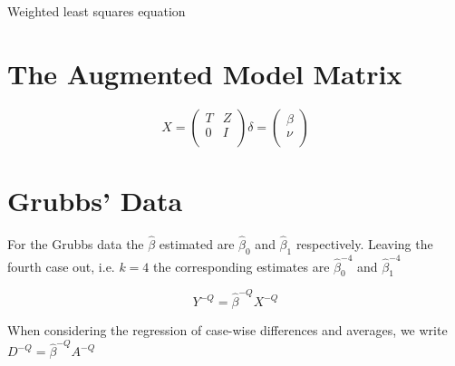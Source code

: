 \documentclass[12pt, a4paper]{article}
\begin{document}
Weighted least squares equation





\section{The Augmented Model Matrix}  %
\begin{equation}
X = \left(%
\begin{array}{cc}
  T & Z \\
  0 & I \\
\end{array}%
\right)
\delta = \left(%
\begin{array}{c}
  \beta  \\
  \nu  \\
\end{array}%
\right)
\end{equation}






\section{Grubbs' Data} %

For the Grubbs data the $\hat{\beta}$ estimated are
$\hat{\beta}_{0}$ and $\hat{\beta}_{1}$ respectively. Leaving the
fourth case out, i.e. $k=4$ the corresponding estimates are
$\hat{\beta}_{0}^{-4}$ and $\hat{\beta}_{1}^{-4}$


\begin{equation}
Y^{-Q} = \hat{\beta}^{-Q}X^{-Q}
\end{equation}

When considering the regression of case-wise differences and averages, we write $D^{-Q} = \hat{\beta}^{-Q}A^{-Q}$
\end{document}
